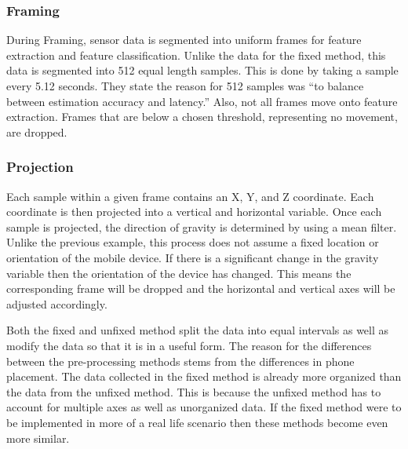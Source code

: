 \documentclass{sig-alternate}
\begin{document}
		
\subsubsection{Framing}{
 During Framing, sensor data is segmented into uniform frames for feature extraction and feature classification. Unlike the data for the fixed method, this data is segmented into 512 equal length samples. This is done by taking a sample every 5.12 seconds. They state the reason for 512 samples was ``to balance between estimation accuracy and latency.'' Also, not all frames move onto feature extraction. Frames that are below a chosen threshold, representing no movement, are dropped. }
\subsubsection{Projection}{
Each sample within a given frame contains an X, Y, and Z coordinate. Each coordinate is then projected into a vertical and horizontal variable. Once each sample is projected, the direction of gravity is determined by using a mean filter. Unlike the previous example, this process does not assume a fixed location or orientation of the mobile device. If there is a significant change in the gravity variable then the orientation of the device has changed. This means the corresponding frame will be dropped and the horizontal and vertical axes will be adjusted accordingly. 
}

	Both the fixed and unfixed method split the data into equal intervals as well as modify the data so that it is in a useful form. The reason for the differences between the pre-processing methods stems from the differences in phone placement. The data collected in the fixed method is already more organized than the data from the unfixed method. This is because the unfixed method has to account for multiple axes as well as unorganized data. If the fixed method were to be implemented in more of a real life scenario then these methods become even more similar. 




\end{document}
